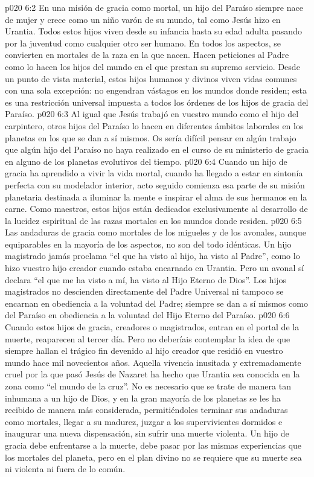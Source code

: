 \vs p020 6:2 \pc En una misión de gracia como mortal, un hijo del Paraíso siempre nace de mujer y crece como un niño varón de su mundo, tal como Jesús hizo en Urantia. Todos estos hijos viven desde su infancia hasta su edad adulta pasando por la juventud como cualquier otro ser humano. En todos los aspectos, se convierten en mortales de la raza en la que nacen. Hacen peticiones al Padre como lo hacen los hijos del mundo en el que prestan su supremo servicio. Desde un punto de vista material, estos hijos humanos y divinos viven vidas comunes con una sola excepción: no engendran vástagos en los mundos donde residen; esta es una restricción universal impuesta a todos los órdenes de los hijos de gracia del Paraíso.
\vs p020 6:3 Al igual que Jesús trabajó en vuestro mundo como el hijo del carpintero, otros hijos del Paraíso lo hacen en diferentes ámbitos laborales en los planetas en los que se dan a sí mismos. Os sería difícil pensar en algún trabajo que algún hijo del Paraíso no haya realizado en el curso de su ministerio de gracia en alguno de los planetas evolutivos del tiempo.
\vs p020 6:4 Cuando un hijo de gracia ha aprendido a vivir la vida mortal, cuando ha llegado a estar en sintonía perfecta con su modelador interior, acto seguido comienza esa parte de su misión planetaria destinada a iluminar la mente e inspirar el alma de sus hermanos en la carne. Como maestros, estos hijos están dedicados exclusivamente al desarrollo de la lucidez espiritual de las razas mortales en los mundos donde residen.
\vs p020 6:5 \pc Las andaduras de gracia como mortales de los migueles y de los avonales, aunque equiparables en la mayoría de los aspectos, no son del todo idénticas. Un hijo magistrado jamás proclama “el que ha visto al hijo, ha visto al Padre”, como lo hizo vuestro hijo creador cuando estaba encarnado en Urantia. Pero un avonal sí declara “el que me ha visto a mí, ha visto al Hijo Eterno de Dios”. Los hijos magistrados no descienden directamente del Padre Universal ni tampoco se encarnan en obediencia a la voluntad del Padre; siempre se dan a sí mismos como  del Paraíso en obediencia a la voluntad del Hijo Eterno del Paraíso.
\vs p020 6:6 \pc Cuando estos hijos de gracia, creadores o magistrados, entran en el portal de la muerte, reaparecen al tercer día. Pero no deberíais contemplar la idea de que siempre hallan el trágico fin devenido al hijo creador que residió en vuestro mundo hace mil novecientos años. Aquella vivencia inusitada y extremadamente cruel por la que pasó Jesús de Nazaret ha hecho que Urantia sea conocida en la zona como “el mundo de la cruz”. No es necesario que se trate de manera tan inhumana a un hijo de Dios, y en la gran mayoría de los planetas se les ha recibido de manera más considerada, permitiéndoles terminar sus andaduras como mortales, llegar a su madurez, juzgar a los supervivientes dormidos e inaugurar una nueva dispensación, sin sufrir una muerte violenta. Un hijo de gracia debe enfrentarse a la muerte, debe pasar por las mismas experiencias que los mortales del planeta, pero en el plan divino no se requiere que su muerte sea ni violenta ni fuera de lo común.
